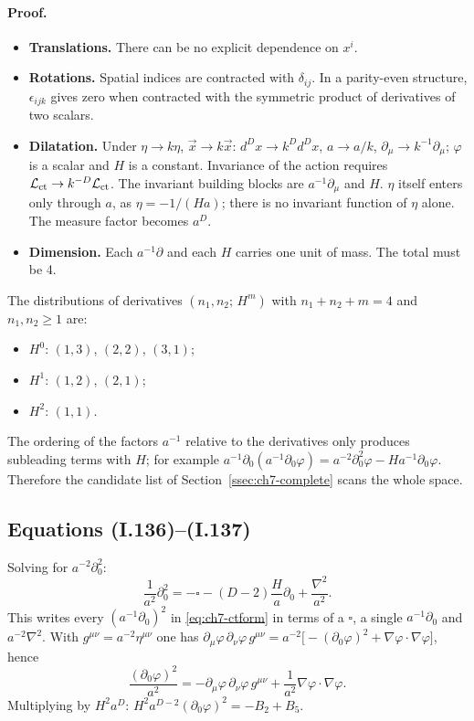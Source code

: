 \paragraph{Proof.}
\begin{itemize}[leftmargin=14pt]
\item \textbf{Translations.} There can be no explicit dependence on $x^i$.
\item \textbf{Rotations.} Spatial indices are contracted with $\delta_{ij}$. In a parity-even structure, $\epsilon_{ijk}$ gives zero when contracted with the symmetric product of derivatives of two scalars.
\item \textbf{Dilatation.} Under $\eta\to k\eta$, $\vec x\to k\vec x$: $d^Dx\to k^Dd^Dx$, $a\to a/k$, $\partial_\mu\to k^{-1}\partial_\mu$; $\varphi$ is a scalar and $H$ is a constant.
Invariance of the action requires $\mathcal{L}_{\mathrm{ct}}\to k^{-D}\mathcal{L}_{\mathrm{ct}}$.
The invariant building blocks are $a^{-1}\partial_\mu$ and $H$.
$\eta$ itself enters only through $a$, as $\eta=-1/(Ha)$; there is no invariant function of $\eta$ alone.
The measure factor becomes $a^D$.
\item \textbf{Dimension.} Each $a^{-1}\partial$ and each $H$ carries one unit of mass. The total must be 4.
\end{itemize}
The distributions of derivatives $(n_1,n_2;\,H^m)$ with $n_1+n_2+m=4$ and $n_1,n_2\ge1$ are:
\begin{itemize}[leftmargin=14pt]
\item $H^0$: $(1,3)$, $(2,2)$, $(3,1)$;
\item $H^1$: $(1,2)$, $(2,1)$;
\item $H^2$: $(1,1)$.
\end{itemize}
The ordering of the factors $a^{-1}$ relative to the derivatives only produces subleading terms with $H$; for example
$a^{-1}\partial_0(a^{-1}\partial_0\varphi)=a^{-2}\partial_0^2\varphi-Ha^{-1}\partial_0\varphi$.
Therefore the candidate list of Section~\ref{ssec:ch7-complete} scans the whole space.

\subsection{Equations (I.136)--(I.137)}
\tD{}
Solving  for $a^{-2}\partial_0^2$:
\begin{equation*}
\frac{1}{a^2}\partial_0^2=-\square-(D-2)\frac{H}{a}\partial_0+\frac{\nabla^2}{a^2}.
\tag{I.136}
\end{equation*}
This writes every $(a^{-1}\partial_0)^2$ in \eqref{eq:ch7-ctform} in terms of a $\square$, a single $a^{-1}\partial_0$ and $a^{-2}\nabla^2$.
With $g^{\mu\nu}=a^{-2}\eta^{\mu\nu}$ one has $\partial_\mu\varphi\,\partial_\nu\varphi\,g^{\mu\nu}=a^{-2}\big[-(\partial_0\varphi)^2+\nabla\varphi\cdot\nabla\varphi\big]$, hence
\begin{equation*}
\frac{(\partial_0\varphi)^2}{a^2}=-\partial_\mu\varphi\,\partial_\nu\varphi\,g^{\mu\nu}+\frac{1}{a^2}\nabla\varphi\cdot\nabla\varphi .
\tag{I.137}
\end{equation*}
Multiplying by $H^2a^D$: $H^2a^{D-2}(\partial_0\varphi)^2=-B_2+B_5$.

